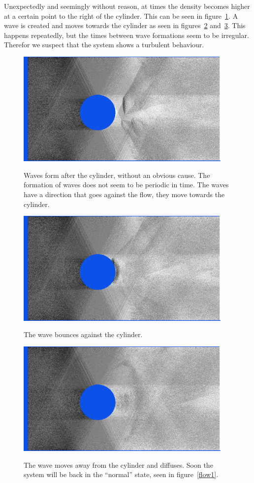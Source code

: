 \documentclass[12pt,a4paper]{article}
\begin{document}
Unexpectedly and seemingly without reason, at times the density becomes higher at a certain point to the right of the cylinder. This can be seen in figure~\ref{flow2}. A wave is created and moves towards the cylinder as seen in figures~\ref{flow3} and~\ref{flow4}. This happens repeatedly, but the times between wave formations seem to be irregular. Therefor we suspect that the system shows a turbulent behaviour.
\begin{figure}[htp]
\centering
  \includegraphics[width=300pt]{figs/scenario3mathexprintscreen10.png}
\label{flow2}
\caption{Waves form after the cylinder, without an obvious cause. The formation of waves does not seem to be periodic in time. The waves have a direction that goes against the flow, they move towards the cylinder.}
\end{figure}

\begin{figure}[htp]
\centering
  \includegraphics[width=300pt]{figs/scenario3mathexprintscreen5.png}
\label{flow3}
\caption{The wave bounces against the cylinder.}
\end{figure}

\begin{figure}[htp]
\centering
  \includegraphics[width=300pt]{figs/scenario3mathexprintscreen6.png}
\label{flow4}
\caption{The wave moves away from the cylinder and diffuses. Soon the system will be back in the ``normal'' state, seen in figure~\ref{flow1}.}
\end{figure}
\end{document}
